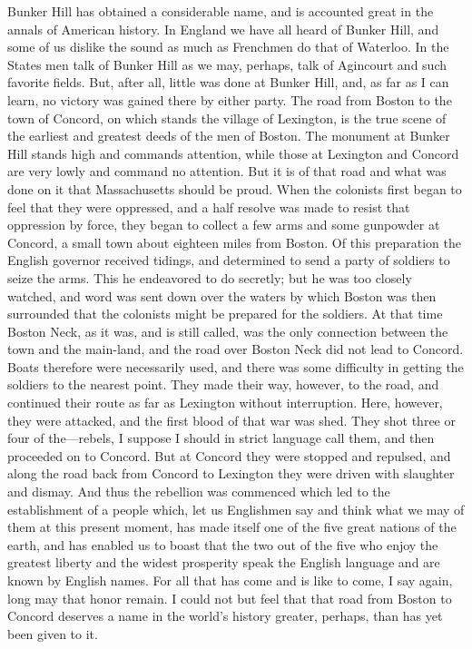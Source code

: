 Bunker Hill has obtained a considerable name, and is accounted
great in the annals of American history.  In England we have all
heard of Bunker Hill, and some of us dislike the sound as much as
Frenchmen do that of Waterloo.  In the States men talk of Bunker
Hill as we may, perhaps, talk of Agincourt and such favorite
fields.  But, after all, little was done at Bunker Hill, and, as
far as I can learn, no victory was gained there by either party.
The road from Boston to the town of Concord, on which stands the
village of Lexington, is the true scene of the earliest and
greatest deeds of the men of Boston.  The monument at Bunker Hill
stands high and commands attention, while those at Lexington and
Concord are very lowly and command no attention.  But it is of that
road and what was done on it that Massachusetts should be proud.
When the colonists first began to feel that they were oppressed,
and a half resolve was made to resist that oppression by force,
they began to collect a few arms and some gunpowder at Concord, a
small town about eighteen miles from Boston.  Of this preparation
the English governor received tidings, and determined to send a
party of soldiers to seize the arms.  This he endeavored to do
secretly; but he was too closely watched, and word was sent down
over the waters by which Boston was then surrounded that the
colonists might be prepared for the soldiers.  At that time Boston
Neck, as it was, and is still called, was the only connection
between the town and the main-land, and the road over Boston Neck
did not lead to Concord.  Boats therefore were necessarily used,
and there was some difficulty in getting the soldiers to the
nearest point.  They made their way, however, to the road, and
continued their route as far as Lexington without interruption.
Here, however, they were attacked, and the first blood of that war
was shed.  They shot three or four of the---rebels, I suppose I
should in strict language call them, and then proceeded on to
Concord.  But at Concord they were stopped and repulsed, and along
the road back from Concord to Lexington they were driven with
slaughter and dismay.  And thus the rebellion was commenced which
led to the establishment of a people which, let us Englishmen say
and think what we may of them at this present moment, has made
itself one of the five great nations of the earth, and has enabled
us to boast that the two out of the five who enjoy the greatest
liberty and the widest prosperity speak the English language and
are known by English names.  For all that has come and is like to
come, I say again, long may that honor remain.  I could not but
feel that that road from Boston to Concord deserves a name in the
world's history greater, perhaps, than has yet been given to it.

